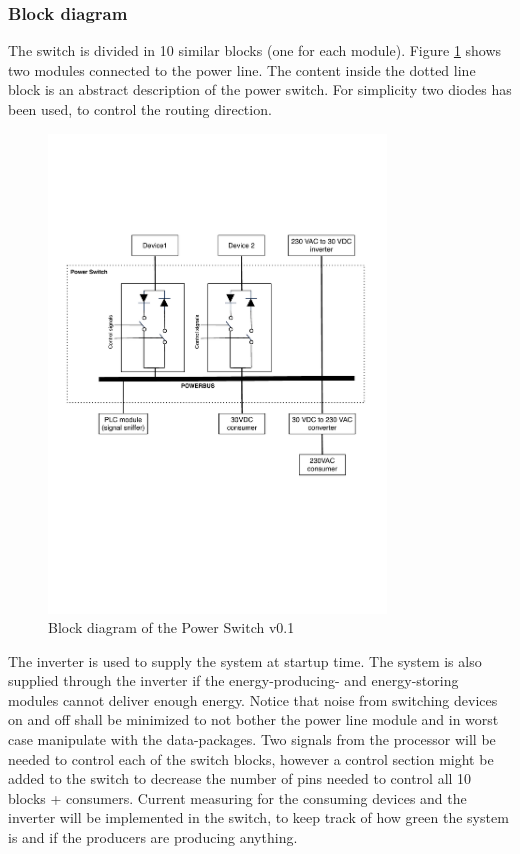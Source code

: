 \subsubsection{Block diagram}
The switch is divided in 10 similar blocks (one for each module). Figure \ref{fig:ps_block_v0_1} shows two modules connected to the power line. The content inside the dotted line block is an abstract description of the power switch. For simplicity two diodes has been used, to control the routing direction.
\begin{figure}[H]
	\begin{centering}
		\includegraphics[width=0.8\textwidth,page=1,angle=0]{content/appendix/eudp/images/power_switch_block_diagram_v0_1}
		\caption{Block diagram of the Power Switch v0.1}
		\label{fig:ps_block_v0_1}
	\end{centering}
\end{figure}
The inverter is used to supply the system at startup time. The system is also supplied through the inverter if the energy-producing- and energy-storing modules cannot deliver enough energy. 
\p Notice that noise from switching devices on and off shall be minimized to not bother the power line module and in worst case manipulate with the data-packages. 
\p Two signals from the processor will be needed to control each of the switch blocks, however a control section might be added to the switch to decrease the number of pins needed to control all 10 blocks + consumers. 
\p Current measuring for the consuming devices and the inverter will be implemented in the switch, to keep track of how green the system is and if the producers are producing anything.  
